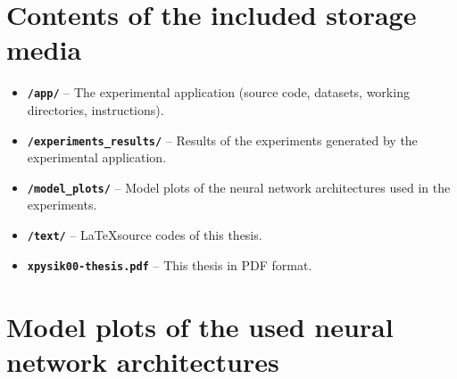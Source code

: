 \chapter{Contents of the included storage media}
\label{appendix-storage-content}

\begin{itemize}
    \item \texttt{\textbf{/app/}} -- The experimental application (source code, datasets, working directories,  instructions).
    \item \texttt{\textbf{/experiments\_results/}} -- Results of the experiments generated by the experimental application.
    \item \texttt{\textbf{/model\_plots/}} -- Model plots of the neural network architectures used in the experiments.
    \item \texttt{\textbf{/text/}} -- \LaTeX source codes of this thesis.
    \item \texttt{\textbf{xpysik00-thesis.pdf}} -- This thesis in PDF format.
\end{itemize}



\chapter{Model plots of the used neural network architectures}
\label{appendix-plots}

